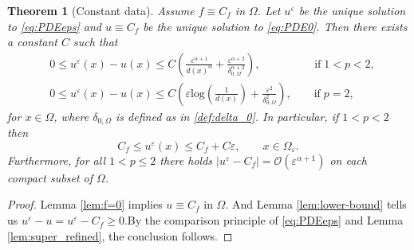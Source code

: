 \documentclass[12pt,reqno]{amsart}
\numberwithin{figure}{section}
\theoremstyle{plain}
\newtheorem{thm}{Theorem}[section]
\theoremstyle{remark}
\numberwithin{equation}{section}
\begin{document}
\begin{thm}[Constant data]\label{thm:rate_doubling0} Assume $f\equiv C_f$ in $\Omega$. Let $u^\varepsilon$ be the unique solution to \eqref{eq:PDEeps} and $u \equiv C_f$ be the unique solution to \eqref{eq:PDE0}. Then there exists a constant $C$ such that 
    \begin{equation*}
    \begin{split}
    &0\leq u^\varepsilon(x) - u(x)\leq C \left(\frac{ \varepsilon^{\alpha+1}}{d(x)^\alpha} + \frac{\varepsilon^{\alpha+2}}{\delta_{0,\Omega}^{\alpha+2}}\right),  \qquad\qquad \;\;\; \text{if}\; 1<p<2,\\
    &0\leq u^\varepsilon(x) - u(x)\leq C \left(\varepsilon \mathrm{log}\left(\frac{1}{d(x)}\right) + \frac{\varepsilon^{2}}{\delta_{0,\Omega}^{2}}\right),  \qquad \text{if}\; p=2,
    \end{split}
\end{equation*}
for $x\in \Omega$, where $\delta_{0,\Omega}$ is defined as in \eqref{def:delta_0}. In particular, if $1<p<2$ then
\begin{equation*}
    C_f\leq u^\varepsilon(x)\leq C_f + C\varepsilon, \qquad x\in \Omega_\varepsilon.
\end{equation*}
Furthermore, for all $1<p\leq 2$ there holds $|u^\varepsilon-C_f| = \mathcal{O}\left(\varepsilon^{\alpha+1}\right)$ on each compact subset of $\Omega$.
\end{thm}
\begin{proof} Lemma \ref{lem:f=0} implies $u \equiv C_f$ in $\Omega$. And Lemma \ref{lem:lower-bound} tells us $u^\varepsilon-u=u^\varepsilon-C_f \geq 0$.By the comparison principle of \eqref{eq:PDEeps} and Lemma \ref{lem:super_refined}, the conclusion follows.
\end{proof}
\end{document}
